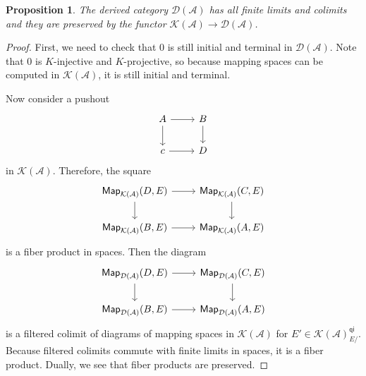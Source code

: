 \documentclass[10pt, oneside]{memoir}
\newtheorem{prop}[thm]{Proposition}
\theoremstyle{definition}
\theoremstyle{remark}
\theoremstyle{plain}
\theoremstyle{definition}
\theoremstyle{remark}
\newcommand{\mc}[1]{\mathcal{#1}}
\newcommand{\ms}[1]{\mathsf{#1}}
\newcommand{\1}{\mathbf{1}}
\newcommand{\2}{\mathbf{2}}
\newcommand{\3}{\mathbf{3}}
\begin{document}
\begin{prop}
    The derived category $\mc{D}(\mc{A})$ has all finite limits and colimits and they are preserved by the functor $\mc{K}(\mc{A}) \to \mc{D}(\mc{A})$.
\end{prop}

\begin{proof}
    First, we need to check that $0$ is still initial and terminal in $\mc{D}(\mc{A})$. Note that $0$ is $K$-injective and $K$-projective, so because mapping spaces can be computed in $\mc{K}(\mc{A})$, it is still initial and terminal.

    Now consider a pushout
    \begin{equation*}
    \begin{tikzcd}
        A \ar{r} \ar{d} & B \ar{d} \\
        c \ar{r} & D
    \end{tikzcd}
    \end{equation*}
    in $\mc{K}(\mc{A})$. Therefore, the square
    \begin{equation*}
    \begin{tikzcd}
        \ms{Map}_{\mc{K}(\mc{A})}(D, E) \ar{r} \ar{d} & \ms{Map}_{\mc{K}(\mc{A})}(C, E) \ar{d} \\
        \ms{Map}_{\mc{K}(\mc{A})}(B, E) \ar{r} & \ms{Map}_{\mc{K}(\mc{A})}(A, E)
    \end{tikzcd}
    \end{equation*}
    is a fiber product in spaces. Then the diagram
    \begin{equation*}
        \begin{tikzcd}
            \ms{Map}_{\mc{D}(\mc{A})}(D, E) \ar{r} \ar{d} & \ms{Map}_{\mc{D}(\mc{A})}(C, E) \ar{d} \\
            \ms{Map}_{\mc{D}(\mc{A})}(B, E) \ar{r} & \ms{Map}_{\mc{D}(\mc{A})}(A, E)
        \end{tikzcd}
    \end{equation*}
    is a filtered colimit of diagrams of mapping spaces in $\mc{K}(\mc{A})$ for $E' \in \mc{K}(\mc{A})_{E/}^{\ms{qi}}$. Because filtered colimits commute with finite limits in spaces, it is a fiber product. Dually, we see that fiber products are preserved.


\end{proof}
\end{document}
